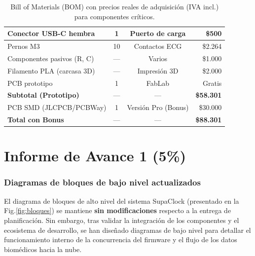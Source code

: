 \documentclass[letterpaper,11pt]{article}
\newcommand{\rfigura}[1]{Fig.\ref{#1}}
\begin{document}
\begin{table}[H]
\begin{tabular}{|l|c|c|r|}
        Conector USB-C hembra         & 1                 & Puerto de carga      & \$500                \\ \hline
        Pernos M3                     & 10                & Contactos ECG        & \$2.264              \\ \hline
        Componentes pasivos (R, C)    & ---               & Varios               & \$1.000              \\ \hline
        Filamento PLA (carcasa 3D)    & ---               & Impresión 3D         & \$2.000              \\ \hline
        PCB prototipo                 & 1                 & FabLab               & Gratis               \\ \hline
        \rowcolor[HTML]{D5F5E3}
        \textbf{Subtotal (Prototipo)} & ---               & ---                  & \textbf{\$58.301}    \\ \hline
        PCB SMD (JLCPCB/PCBWay)       & 1                 & Versión Pro (Bonus)  & \$30.000             \\ \hline
        \rowcolor[HTML]{ABEBC6}
        \textbf{Total con Bonus}      & ---               & ---                  & \textbf{\$88.301}    \\ \hline
    \end{tabular}
    \caption{Bill of Materials (BOM) con precios reales de adquisición (IVA incl.) para componentes críticos.}
    \label{tab:bom}
\end{table}




\newpage
\part*{Informe de Avance 1 (5\%)}

\section{Diagramas de bloques de bajo nivel actualizados}

El diagrama de bloques de alto nivel del sistema SupaClock (presentado en la \rfigura{fig:bloques}) se mantiene \textbf{sin modificaciones} respecto a la entrega de planificación. Sin embargo, tras validar la integración de los componentes y el ecosistema de desarrollo, se han diseñado diagramas de bajo nivel para detallar el funcionamiento interno de la concurrencia del firmware y el flujo de los datos biomédicos hacia la nube.
\end{document}
